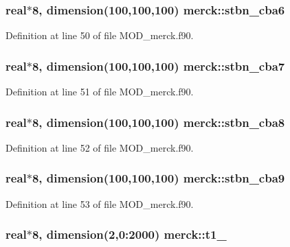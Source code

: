 \hypertarget{classmerck_a8768196f4b41bfc312ca8a0f5829da3e}{
\subsubsection[{stbn\-\_\-cba6}]{\setlength{\rightskip}{0pt plus 5cm}real$\ast$8, dimension(100,100,100) merck\-::stbn\-\_\-cba6}}\label{classmerck_a8768196f4b41bfc312ca8a0f5829da3e}


Definition at line 50 of file M\-O\-D\-\_\-merck.\-f90.

\hypertarget{classmerck_a9f9997b9bb4d573760adc189f3fe7926}{
\subsubsection[{stbn\-\_\-cba7}]{\setlength{\rightskip}{0pt plus 5cm}real$\ast$8, dimension(100,100,100) merck\-::stbn\-\_\-cba7}}\label{classmerck_a9f9997b9bb4d573760adc189f3fe7926}


Definition at line 51 of file M\-O\-D\-\_\-merck.\-f90.

\hypertarget{classmerck_a6cba162dae532979a56bbfcc27ead348}{
\subsubsection[{stbn\-\_\-cba8}]{\setlength{\rightskip}{0pt plus 5cm}real$\ast$8, dimension(100,100,100) merck\-::stbn\-\_\-cba8}}\label{classmerck_a6cba162dae532979a56bbfcc27ead348}


Definition at line 52 of file M\-O\-D\-\_\-merck.\-f90.

\hypertarget{classmerck_a729100fe8948bce8c2e25f4433c3f69f}{
\subsubsection[{stbn\-\_\-cba9}]{\setlength{\rightskip}{0pt plus 5cm}real$\ast$8, dimension(100,100,100) merck\-::stbn\-\_\-cba9}}\label{classmerck_a729100fe8948bce8c2e25f4433c3f69f}


Definition at line 53 of file M\-O\-D\-\_\-merck.\-f90.

\hypertarget{classmerck_a5077f091d33060cb8ffc6a427f0f25cd}{
\subsubsection[{t1\-\_\-1}]{\setlength{\rightskip}{0pt plus 5cm}real$\ast$8, dimension(2,0\-:2000) merck\-::t1\-\_}}\label{classmerck_a5077f091d33060cb8ffc6a427f0f25cd}


